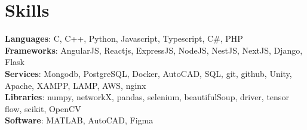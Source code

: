 \section*{\sc Skills}
\vspace{-2mm}
\hrulefill
\vspace{1mm}

\textbf{Languages}: C, C++, Python, Javascript, Typescript, C\#, PHP\\
\textbf{Frameworks}: AngularJS, Reactjs, ExpressJS, NodeJS, NestJS, NextJS,
Django, Flask\\
\textbf{Services}: Mongodb, PostgreSQL, Docker, AutoCAD, SQL, git, github,
Unity, Apache, XAMPP, LAMP, AWS, nginx\\
\textbf{Libraries}: numpy, networkX, pandas, selenium, beautifulSoup, driver,
tensor flow, scikit, OpenCV \\
\textbf{Software}: MATLAB, AutoCAD, Figma
